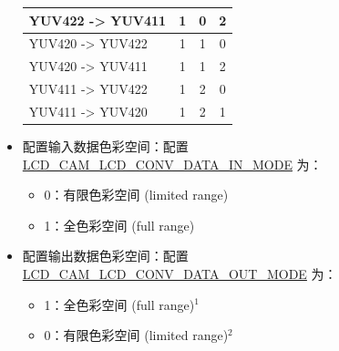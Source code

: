 \documentclass[main\_\_CN.tex]{subfiles}
\begin{document}
\begin{itemize}
\begin{table}[H]
\begin{threeparttable}
\begin{tabular}{|l|c|c|c|}
        YUV422 -> YUV411 & 1 & 0 & 2 \\ \hline
        YUV420 -> YUV422 & 1 & 1 & 0 \\ \hline
        YUV420 -> YUV411 & 1 & 1 & 2 \\ \hline
        YUV411 -> YUV422 & 1 & 2 & 0 \\ \hline
        YUV411 -> YUV420 & 1 & 2 & 1 \\ \hline
        \end{tabular}
     \end{threeparttable}
    \end{table}

    \item 配置输入数据色彩空间：配置 \hyperref[fielddesc:LCDCAMLCDCONVDATAINMODE]{LCD\_CAM\_LCD\_CONV\_DATA\_IN\_MODE} 为：
    \begin{itemize}
        \item 0：有限色彩空间 (limited range)
        \item 1：全色彩空间 (full range)
    \end{itemize}

    \item 配置输出数据色彩空间：配置 \hyperref[fielddesc:LCDCAMLCDCONVDATAOUTMODE]{LCD\_CAM\_LCD\_CONV\_DATA\_OUT\_MODE} 为：
    \begin{itemize}
        \item 1：全色彩空间 (full range)\hyperref[full-color-range-note]{$^1$}
        \item 0：有限色彩空间 (limited range)\hyperref[limited-color-range-note]{$^2$}
    \end{itemize}
\end{itemize}
\end{document}

